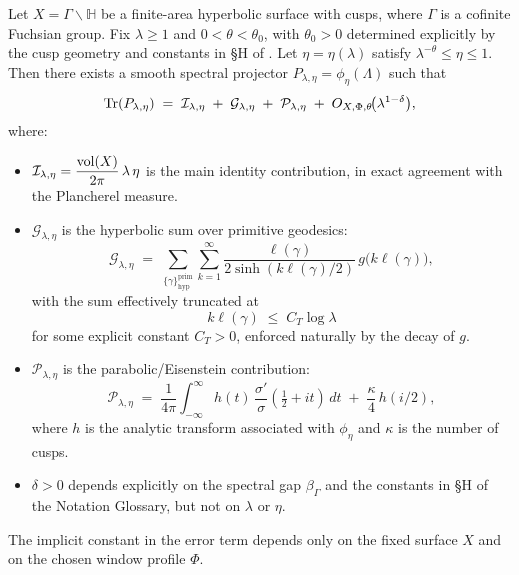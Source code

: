 \medskip

\begin{theorem}\label{thm:intro-localized-trace}
Let $X=\Gamma\backslash\mathbb{H}$ be a finite-area hyperbolic surface with cusps,
where $\Gamma$ is a cofinite Fuchsian group.
Fix $\lambda\ge 1$ and $0<\theta<\theta_0$, with $\theta_0>0$ determined explicitly
by the cusp geometry and constants in \S H of .
Let $\eta=\eta(\lambda)$ satisfy $\lambda^{-\theta}\le \eta\le 1$.
Then there exists a smooth spectral projector $P_{\lambda,\eta}=\phi_\eta(\Lambda)$
such that
\[
  \operatorname{Tr}(P_{\lambda,\eta})
  \;=\;
  \mathcal{I}_{\lambda,\eta}
  \;+\;
  \mathcal{G}_{\lambda,\eta}
  \;+\;
  \mathcal{P}_{\lambda,\eta}
  \;+\;
  O_{X,\Phi,\theta}\!\big(\lambda^{1-\delta}\big),
\]
where:
\begin{itemize}
  \item $\mathcal{I}_{\lambda,\eta} = \dfrac{\operatorname{vol}(X)}{2\pi}\,\lambda\,\eta$
        is the main identity contribution, in exact agreement with the Plancherel measure.
  \item $\mathcal{G}_{\lambda,\eta}$ is the hyperbolic sum over primitive geodesics:
  \[
    \mathcal{G}_{\lambda,\eta}
    \;=\;
    \sum_{\{\gamma\}^{\mathrm{prim}}_{\mathrm{hyp}}}
    \sum_{k=1}^\infty
    \frac{\ell(\gamma)}{2\sinh(k\ell(\gamma)/2)}\,
    g\!\big(k\ell(\gamma)\big),
  \]
  with the sum effectively truncated at
  \[
    k\ell(\gamma)\;\leq\; C_T\log\lambda
  \]
  for some explicit constant $C_T>0$,
  enforced naturally by the decay of $g$.
  \item $\mathcal{P}_{\lambda,\eta}$ is the parabolic/Eisenstein contribution:
  \[
    \mathcal{P}_{\lambda,\eta}
    \;=\;
    \frac{1}{4\pi}\int_{-\infty}^{\infty}
      h(t)\,\frac{\sigma'}{\sigma}(\tfrac{1}{2}+it)\,dt
    \;+\;
    \frac{\kappa}{4}\,h(i/2),
  \]
  where $h$ is the analytic transform associated with $\phi_\eta$
  and $\kappa$ is the number of cusps.
  \item $\delta>0$ depends explicitly on the spectral gap $\beta_\Gamma$
        and the constants in \S H of the Notation Glossary,
        but not on $\lambda$ or $\eta$.
\end{itemize}
The implicit constant in the error term depends only on the fixed surface $X$
and on the chosen window profile $\Phi$.
\end{theorem}

\medskip

